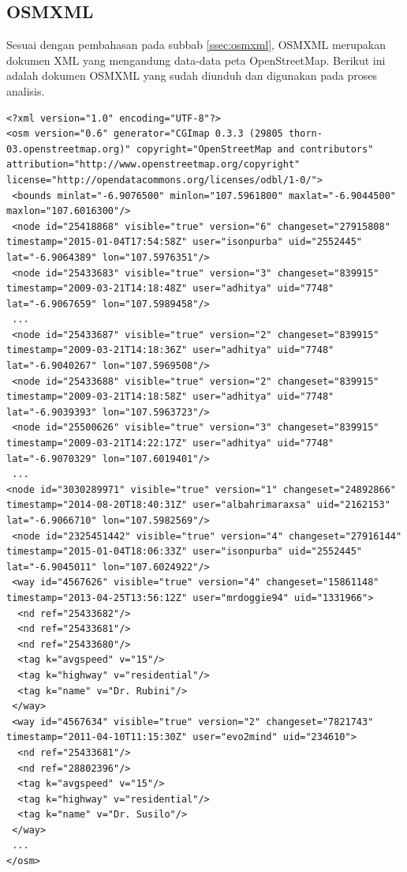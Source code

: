 \subsection{OSMXML}
Sesuai dengan pembahasan pada subbab \ref{ssec:osmxml}, OSMXML merupakan dokumen
XML yang mengandung data-data peta OpenStreetMap. Berikut ini adalah dokumen
OSMXML yang sudah diunduh dan digunakan pada proses analisis.
\begin{lstlisting}
<?xml version="1.0" encoding="UTF-8"?>
<osm version="0.6" generator="CGImap 0.3.3 (29805 thorn-03.openstreetmap.org)" copyright="OpenStreetMap and contributors" attribution="http://www.openstreetmap.org/copyright" license="http://opendatacommons.org/licenses/odbl/1-0/">
 <bounds minlat="-6.9076500" minlon="107.5961800" maxlat="-6.9044500" maxlon="107.6016300"/>
 <node id="25418868" visible="true" version="6" changeset="27915808" timestamp="2015-01-04T17:54:58Z" user="isonpurba" uid="2552445" lat="-6.9064389" lon="107.5976351"/>
 <node id="25433683" visible="true" version="3" changeset="839915" timestamp="2009-03-21T14:18:48Z" user="adhitya" uid="7748" lat="-6.9067659" lon="107.5989458"/>
 ...
 <node id="25433687" visible="true" version="2" changeset="839915" timestamp="2009-03-21T14:18:36Z" user="adhitya" uid="7748" lat="-6.9040267" lon="107.5969508"/>
 <node id="25433688" visible="true" version="2" changeset="839915" timestamp="2009-03-21T14:18:58Z" user="adhitya" uid="7748" lat="-6.9039393" lon="107.5963723"/>
 <node id="25500626" visible="true" version="3" changeset="839915" timestamp="2009-03-21T14:22:17Z" user="adhitya" uid="7748" lat="-6.9070329" lon="107.6019401"/>
 ...
<node id="3030289971" visible="true" version="1" changeset="24892866" timestamp="2014-08-20T18:40:31Z" user="albahrimaraxsa" uid="2162153" lat="-6.9066710" lon="107.5982569"/>
 <node id="2325451442" visible="true" version="4" changeset="27916144" timestamp="2015-01-04T18:06:33Z" user="isonpurba" uid="2552445" lat="-6.9045011" lon="107.6024922"/>
 <way id="4567626" visible="true" version="4" changeset="15861148" timestamp="2013-04-25T13:56:12Z" user="mrdoggie94" uid="1331966">
  <nd ref="25433682"/>
  <nd ref="25433681"/>
  <nd ref="25433680"/>
  <tag k="avgspeed" v="15"/>
  <tag k="highway" v="residential"/>
  <tag k="name" v="Dr. Rubini"/>
 </way>
 <way id="4567634" visible="true" version="2" changeset="7821743" timestamp="2011-04-10T11:15:30Z" user="evo2mind" uid="234610">
  <nd ref="25433681"/>
  <nd ref="28802396"/>
  <tag k="avgspeed" v="15"/>
  <tag k="highway" v="residential"/>
  <tag k="name" v="Dr. Susilo"/>
 </way>
 ...
</osm>
\end{lstlisting}
